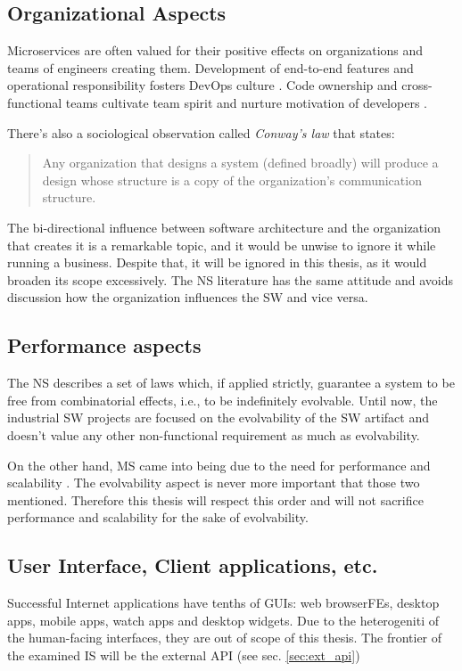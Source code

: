 \documentclass[thesis=M,english,hidelinks]{FITthesis}[2012/10/20]
\begin{document}
\subsection{Organizational Aspects}
Microservices are often valued for their positive effects on organizations and teams of engineers creating them. Development of end-to-end features and operational responsibility fosters DevOps culture \cite{devops-what-is}. Code ownership and cross-functional teams cultivate team spirit and nurture motivation of developers \cite{ms-fow-new-term-def, ms-modelling-with-petter, ms-building-ms}.

There's also a sociological observation called \textit{Conway's law} that states:
\begin{quote}
    Any organization that designs a system (defined broadly) will produce a design whose structure is a copy of the organization's communication structure.~\cite{conways-law}
\end{quote}

The bi-directional influence between software architecture and the organization that creates it is a remarkable topic, and it would be unwise to ignore it while running a business. Despite that, it will be ignored in this thesis, as it would broaden its scope excessively. The \acrshort{NS} literature \cite{ns-recreating, ns-toward-general-theory} has the same attitude and avoids discussion how the organization influences the \acrshort{SW} and vice versa.

\subsection{Performance aspects}
The \acrlong{NS} describes a set of laws which, if applied strictly, guarantee a system to be free from combinatorial effects, i.e., to be indefinitely evolvable. Until now, the industrial \acrlong{SW} projects \cite{ns-it-isnt-different, ns-exploring-defence} are focused on the evolvability of the \acrshort{SW} artifact and doesn't value any other non-functional requirement as much as evolvability.

On the other hand, \acrlong{MS} came into being due to the need for performance and scalability \cite{ms-building-ms, ms-evolutionary-arch}. The evolvability aspect is never more important that those two mentioned. Therefore this thesis will respect this order and will not sacrifice performance and scalability for the sake of evolvability.

\subsection{User Interface, Client applications, etc. }
Successful Internet applications have tenths of \acrshort{GUI}s: web browser\acrshort{FE}s, desktop apps, mobile apps, watch apps and desktop widgets. Due to the heterogeniti of the human-facing interfaces, they are out of scope of this thesis. The frontier of the examined \acrfull{IS} will be the external \acrfull{API} (see sec. \ref{sec:ext_api})
\end{document}
